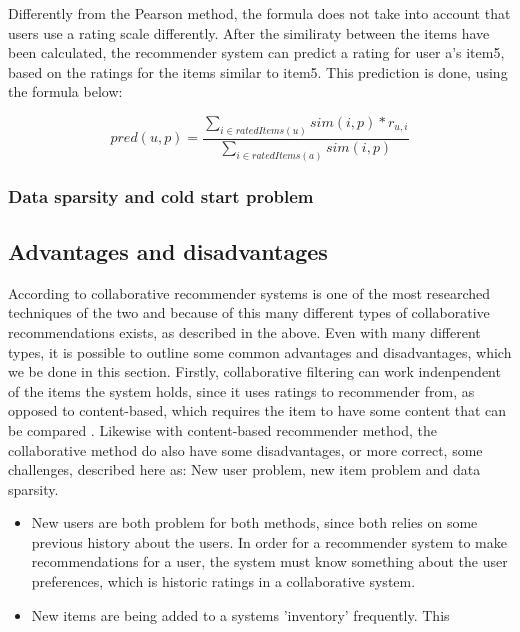 Differently from the Pearson method, the formula does not take into account that users use a rating scale differently. 
After the similiraty between the items have been calculated, the recommender system can predict a rating for user a's item5, based on the ratings for the items similar to item5. This prediction is done, using the formula below:

\[
	pred(u,p) = \frac{\sum_{i\in ratedItems(u)} sim(i,p) * r_{u,i}}{\sum_{i \in ratedItems(a)} sim(i,p)}
\]

\subsubsection{Data sparsity and cold start problem}

\subsection{Advantages and disadvantages}
According to  collaborative recommender systems is one of the most researched techniques of the two and because of this many different types of collaborative recommendations exists, as described in the above. Even with many different types, it is possible to outline some common advantages and disadvantages, which we be done in this section. Firstly, collaborative filtering can work indenpendent of the items the system holds, since it uses ratings to recommender from, as opposed to content-based, which requires the item to have some content that can be compared . 
Likewise with content-based recommender method, the collaborative method do also have some disadvantages, or more correct, some challenges, described here as: New user problem, new item problem and data sparsity. 
\begin{itemize}
	\item New users are both problem for both methods, since both relies on some previous history about the users. In order for a recommender system to make recommendations for a user, the system must know something about the user preferences, which is historic ratings in a collaborative system. 
	\item New items are being added to a systems 'inventory'  frequently. This 
\end{itemize}
